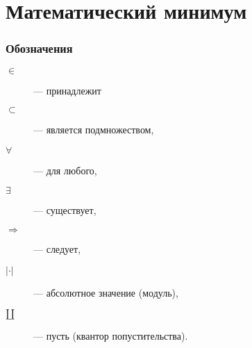 \chapter{Математический минимум}
\subsection*{Обозначения}
\begin{description}
\item[$\in$] --- принадлежит
\item[$\subset$] --- является подмножеством,
\item[$\forall$] --- для любого,
\item[$\exists$] --- существует,
\item[$\Rightarrow$] --- следует,
\item[$|\cdot|$] --- абсолютное значение (модуль),
\item[$\amalg$] --- пусть (квантор попустительства).
\end{description}
